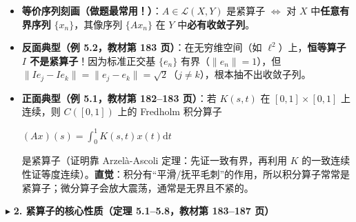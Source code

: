 \documentclass[11pt,a4paper]{article}
\providecommand{\tightlist}{\setlength{\itemsep}{1.8pt}\setlength{\parskip}{0pt}}
\newcommand{\SubSubHeading}[1]{%
  \Needspace{6.5\baselineskip}\vspace{5.5pt}\noindent
  \textcolor{AccentMain}{\scriptsize$\blacktriangleright$}\hspace{4pt}%
  {\small\bfseries\color{AccentMain}#1}\par\nopagebreak[4]\vspace{2.5pt}%
}
\newcommand{\FitDisplayMath}[1]{%
  \par\vspace{4pt}\noindent
  \begin{adjustbox}{max width=\linewidth, center}
    $\displaystyle #1$
  \end{adjustbox}
  \par\vspace{4pt}%
}
\begin{document}
\begin{itemize}
\tightlist
\item
  \textbf{等价序列刻画（做题最常用！）}：\(A \in \mathcal{L}(X, Y)\) 是紧算子 \(\iff\) 对 \(X\) 中\textbf{任意有界序列} \(\{x_n\}\)，其像序列 \(\{Ax_n\}\) 在 \(Y\) 中\textbf{必有收敛子列}。
\item
  \textbf{反面典型（例 5.2，教材第 183 页）}：在无穷维空间（如 \(\ell^2\)）上，\textbf{恒等算子 \(I\) 不是紧算子}！因为标准正交基 \(\{e_n\}\) 有界（\(\|e_n\|=1\)），但 \(\|Ie_j - Ie_k\| = \|e_j - e_k\| = \sqrt{2}\)（\(j \neq k\)），根本抽不出收敛子列。
\item
  \textbf{正面典型（例 5.1，教材第 182--183 页）}：若 \(K(s, t)\) 在 \([0,1] \times [0,1]\) 上连续，则 \(C([0,1])\) 上的 Fredholm 积分算子 
\FitDisplayMath{(Ax)(s) = \int_0^1 K(s, t) x(t) \mathrm{d}t}
 是紧算子（证明靠 Arzelà-Ascoli 定理：先证一致有界，再利用 \(K\) 的一致连续性证等度连续）。\textbf{直觉}：积分有``平滑/抚平毛刺''的作用，所以积分算子常常是紧算子；微分算子会放大震荡，通常是无界且不紧的。
\end{itemize}

\SubSubHeading{2. 紧算子的核心性质（定理 5.1--5.8，教材第 183--187 页）}
\end{document}

